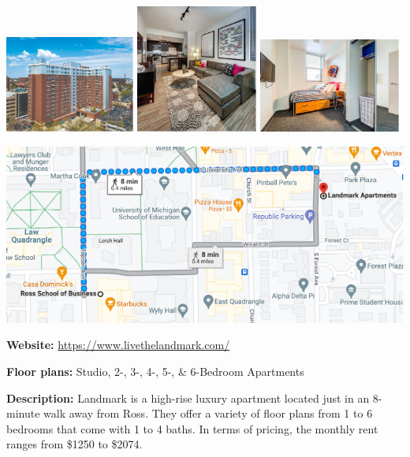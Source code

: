 \documentclass[
]{book}
\begin{document}
\includegraphics[width=0.32\textwidth,height=\textheight]{landmark_exterior1.png}
\includegraphics[width=0.3\textwidth,height=\textheight]{landmark_interior.png}
\includegraphics[width=0.35\textwidth,height=\textheight]{landmark_interior2.png}

\begin{center}\includegraphics{landmark_map} \end{center}

\textbf{Website:} \url{https://www.livethelandmark.com/}

\textbf{Floor plans:} Studio, 2-, 3-, 4-, 5-, \& 6-Bedroom Apartments

\textbf{Description:} Landmark is a high-rise luxury apartment located just in an 8-minute walk away from Ross. They offer a variety of floor plans from 1 to 6 bedrooms that come with 1 to 4 baths. In terms of pricing, the monthly rent ranges from \$1250 to \$2074.
\end{document}
